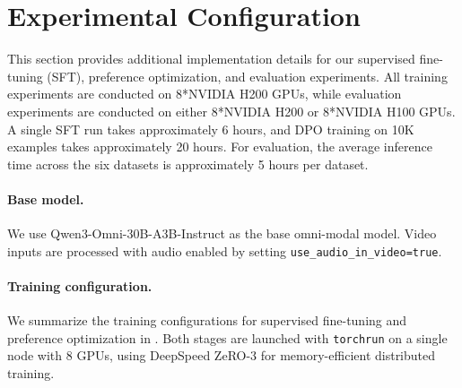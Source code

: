 \documentclass{llmxive}
\begin{document}

\section{Experimental Configuration}
\label{app:experimental-configuration}

This section provides additional implementation details for our supervised fine-tuning (SFT), preference optimization, and evaluation experiments. All training experiments are conducted on 8*NVIDIA H200 GPUs, while evaluation experiments are conducted on either 8*NVIDIA H200 or 8*NVIDIA H100 GPUs. A single SFT run takes approximately 6 hours, and DPO training on 10K examples takes approximately 20 hours. For evaluation, the average inference time across the six datasets is approximately 5 hours per dataset.

\paragraph{Base model.}
We use Qwen3-Omni-30B-A3B-Instruct as the base omni-modal model. Video inputs are processed with audio enabled by setting \texttt{use\_audio\_in\_video=true}.

\paragraph{Training configuration.}
We summarize the training configurations for supervised fine-tuning and preference optimization in . Both stages are launched with \texttt{torchrun} on a single node with 8 GPUs, using DeepSpeed ZeRO-3 for memory-efficient distributed training. 
\end{document}
